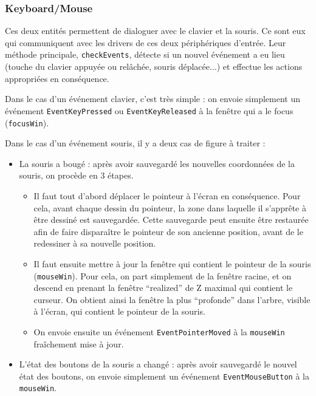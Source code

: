 \subsubsection{Keyboard/Mouse}

Ces deux entités permettent de dialoguer avec le clavier et la souris. Ce sont eux qui communiquent avec les drivers de ces deux périphériques d'entrée. Leur méthode principale, \verb|checkEvents|, détecte si un nouvel événement a eu lieu (touche du clavier appuyée ou relâchée, souris déplacée...) et effectue les actions appropriées en conséquence.

Dans le cas d'un événement clavier, c'est très simple : on envoie simplement un événement \verb|EventKeyPressed| ou \verb|EventKeyReleased| à la fenêtre qui a le focus (\verb|focusWin|).

Dans le cas d'un événement souris, il y a deux cas de figure à traiter :
\begin{itemize}
  \item La souris a bougé : après avoir sauvegardé les nouvelles coordonnées de la souris, on procède en 3 étapes.
    \begin{itemize}
      \item Il faut tout d'abord déplacer le pointeur à l'écran en conséquence. Pour cela, avant chaque dessin du pointeur, la zone dans laquelle il s'apprête à être dessiné est sauvegardée. Cette sauvegarde peut ensuite être restaurée afin de faire disparaître le pointeur de son ancienne position, avant de le redessiner à sa nouvelle position.
      \item Il faut ensuite mettre à jour la fenêtre qui contient le pointeur de la souris (\verb|mouseWin|). Pour cela, on part simplement de la fenêtre racine, et on descend en prenant la fenêtre ``realized'' de Z maximal qui contient le curseur. On obtient ainsi la fenêtre la plus ``profonde'' dans l'arbre, visible à l'écran, qui contient le pointeur de la souris.
      \item On envoie ensuite un événement \verb|EventPointerMoved| à la \verb|mouseWin| fraîchement mise à jour.
    \end{itemize}
  \item L'état des boutons de la souris a changé : après avoir sauvegardé le nouvel état des boutons, on envoie simplement un événement \verb|EventMouseButton| à la \verb|mouseWin|.
\end{itemize}

